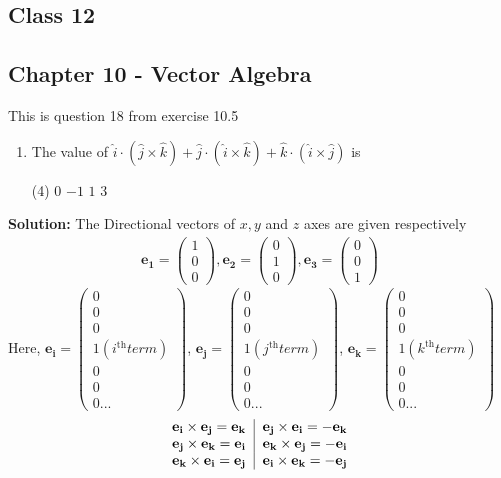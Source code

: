 \documentclass[12pt]{article}
\newcommand{\myvec}[1]{\ensuremath{\begin{pmatrix}#1\end{pmatrix}}}
\let\vec\mathbf
\begin{document}
\begin{center}
 \section*{\textbf{Class 12}}
 \subsection*{Chapter 10 - Vector Algebra}
\end{center}
This is question 18 from exercise 10.5
\begin{enumerate}
\item  The value of  $\hat{i} \cdot (\hat{j} \times \hat{k})+\hat{j} \cdot (\hat{i} \times \hat{k})+\hat{k} \cdot (\hat{i} \times \hat{j})$ is
\begin{tasks}(4)
          \task $0$ 
          \task $-1$ 
          \task $1$ 
          \task $3$  
          \end{tasks}
\end{enumerate}
\textbf{Solution:}
The Directional vectors of $x,y$ and $z$ axes are given respectively 
\begin{align}
\vec{e_1} =\myvec{1\\0\\0}, \vec{e_2}=\myvec{0\\1\\0}, \vec{e_3} =\myvec{0\\0\\1}
\end{align}
Here,
$\vec{e_i} = \myvec{0\\0\\0\\1 (i^{\text{th}} term)\\0\\0\\0...}$, $\vec{e_j} = \myvec{0\\0\\0\\1 (j^{\text{th}} term)\\0\\0\\0...}$, $\vec{e_k} = \myvec{0\\0\\0\\1 (k^{\text{th}} term)\\0\\0\\0...}$ \\

\[
\begin{aligned}
\begin{tabular} {l|l}
$\vec{e_i} \times \vec{e_j} = \vec{e_k}$ &$\vec{e_j} \times \vec{e_i} = -\vec{e_k}$ \\
$\vec{e_j} \times \vec{e_k} = \vec{e_i}$ & $\vec{e_k} \times \vec{e_j} = -\vec{e_i}$ \\
$\vec{e_k} \times \vec{e_i} = \vec{e_j}$ &$\vec{e_i} \times \vec{e_k} = -\vec{e_j}$ \\
\end{tabular}
\end{aligned}
\] \\
\end{document}
